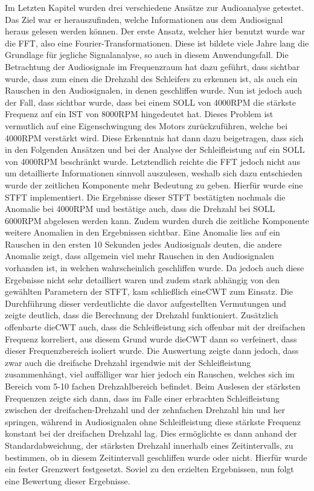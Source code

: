 Im Letzten Kapitel wurden drei verschiedene Ansätze zur Audioanalyse getestet. Das Ziel war er herauszufinden, welche Informationen aus dem Audiosignal heraus gelesen werden können. Der erste Ansatz, welcher hier benutzt wurde war die \ac{FFT}, also eine Fourier-Transformationen. Diese ist bildete viele Jahre lang die Grundlage für jegliche Signalanalyse, so auch in diesem Anwendungsfall. Die Betrachtung der Audiosignale im Frequenzraum hat dazu geführt, dass sichtbar wurde, dass zum einen die Drehzahl des Schleifers zu erkennen ist, als auch ein Rauschen in den Audiosignalen, in denen geschliffen wurde. Nun ist jedoch auch der Fall, dass sichtbar wurde, dass bei einem SOLL von 4000RPM die stärkste Frequenz auf ein IST von 8000RPM hingedeutet hat. Dieses Problem ist vermutlich auf eine Eigenschwingung des Motors zurückzuführen, welche bei 4000RPM verstärkt wird. Diese Erkenntnis hat dann dazu beigetragen, dass sich in den Folgenden Ansätzen und bei der Analyse der Schleifleistung auf ein SOLL von 4000RPM beschränkt wurde. Letztendlich reichte die \ac{FFT} jedoch nicht aus um detaillierte Informationen sinnvoll auszulesen, weshalb sich dazu entschieden wurde der zeitlichen Komponente mehr Bedeutung zu geben. Hierfür wurde eine \ac{STFT} implementiert. Die Ergebnisse dieser \ac{STFT} bestätigten nochmals die Anomalie bei 4000RPM und bestätige auch, dass die Drehzahl bei SOLL 6000RPM abgelesen werden kann. Zudem wurden durch die zeitliche Komponente weitere Anomalien in den Ergebnissen sichtbar. Eine Anomalie lies auf ein Rauschen in den ersten 10 Sekunden jedes Audiosignals deuten, die andere Anomalie zeigt, dass allgemein viel mehr Rauschen in den Audiosignalen vorhanden ist, in welchen wahrscheinlich geschliffen wurde. Da jedoch auch diese Ergebnisse nicht sehr detailliert waren und zudem stark abhängig von den gewählten Parametern der STFT, kam schließlich eine\ac{CWT} zum Einsatz. Die Durchführung dieser verdeutlichte die davor aufgestellten Vermutungen und zeigte deutlich, dass die Berechnung der Drehzahl funktioniert. Zusätzlich offenbarte die\ac{CWT} auch, dass die Schleifleistung sich offenbar mit der dreifachen Frequenz korreliert, aus diesem Grund wurde die\ac{CWT} dann so verfeinert, dass dieser Frequenzbereich isoliert wurde. Die Auswertung zeigte dann jedoch, dass zwar auch die dreifache Drehzahl irgendwie mit der Schleifleistung zusammenhängt, viel auffälliger war hier jedoch ein Rauschen, welches sich im Bereich vom 5-10 fachen Drehzahlbereich befindet. Beim Auslesen der stärksten Frequenzen zeigte sich dann, dass im Falle einer erbrachten Schleifleistung zwischen der dreifachen-Drehzahl und der zehnfachen Drehzahl hin und her springen, während in Audiosignalen ohne Schleifleistung diese stärkste Frequenz konstant bei der dreifachen Drehzahl lag. Dies ermöglichte es dann anhand der Standardabweichung, der stärksten Drehzahl innerhalb eines Zeitintervalls, zu bestimmen, ob in diesem Zeitintervall geschliffen wurde oder nicht. Hierfür wurde ein fester Grenzwert festgesetzt. Soviel zu den erzielten Ergebnissen, nun folgt eine Bewertung dieser Ergebnisse. 

